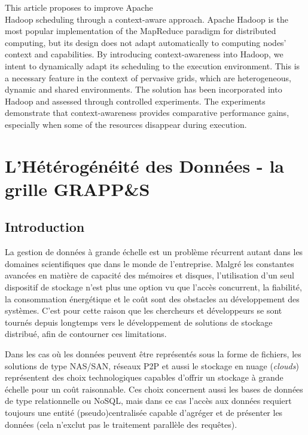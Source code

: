 \begin{resume}
	This article proposes to improve Apache \\Hadoop scheduling through a context-aware approach. Apache Hadoop is the most popular implementation of the MapReduce paradigm for distributed computing, but its design does not adapt automatically to computing nodes' context and capabilities. By introducing context-awareness into Hadoop, we intent to dynamically adapt its scheduling to the execution environment. This is a necessary feature in the context of pervasive grids, which are heterogeneous, dynamic and shared environments. The solution has been incorporated into Hadoop and assessed through controlled experiments. The experiments demonstrate that context-awareness provides comparative performance gains, especially when some of the resources disappear during execution.
\end{resume}

\section{L'Hétérogénéité des Données - la grille GRAPP\&S} \label{sec:GRAPPES}


\subsection{Introduction}

La gestion de données à grande échelle est un problème récurrent autant dans les domaines scientifiques que dans le monde de l'entreprise. Malgré les constantes avancées en matière de capacité des mémoires et disques, l'utilisation d'un seul dispositif de stockage n'est plus une option vu que l'accès concurrent, la fiabilité, la consommation énergétique et le coût sont des obstacles au développement des systèmes. C'est pour cette raison que les chercheurs et développeurs se sont tournés depuis longtemps vers le développement de solutions de stockage distribué, afin de contourner ces limitations.

Dans les cas où les données peuvent être représentés sous la forme de fichiers, les solutions de type NAS/SAN, réseaux P2P et aussi le stockage en nuage (\textit{clouds}) représentent des choix technologiques capables d'offrir un stockage à grande échelle pour un coût raisonnable. Ces choix concernent aussi les bases de données de type relationnelle ou NoSQL, mais dans ce cas l'accès aux données requiert toujours une entité (pseudo)centralisée capable d'agréger et de présenter les données (cela n'exclut pas le traitement parallèle des requêtes). 

